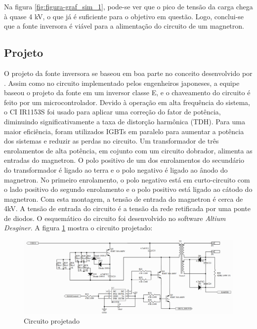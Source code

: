 Na figura \ref{fig:figura-graf_sim_1}, pode-se ver que o pico de tensão da carga chega à quase 4 kV, o que já é suficiente para o objetivo em questão. Logo, conclui-se que a fonte inversora é viável para a alimentação do circuito de um magnetron.

\subsection{Projeto}

O projeto da fonte inversora se baseou em boa parte no conceito desenvolvido por . Assim como no circuito implementado pelos engenheiros japoneses, a equipe baseou o projeto da fonte em um inversor classe E, e o chaveamento do circuito é feito por um microcontrolador. Devido à operação em alta frequência do sistema, o CI IR1153S foi usado para aplicar uma correção do fator de potência, diminuindo significativamente a taxa de distorção harmônica (TDH). Para uma maior eficiência, foram utilizados IGBTs em paralelo para aumentar a potência dos sistemas e reduzir as perdas no circuito. Um transformador de três enrolamentos de alta potência, em cojunto com um circuito dobrador, alimenta as entradas do magnetron. O polo positivo de um dos enrolamentos do secundário do transformador é ligado ao terra e o polo negativo é ligado ao ânodo do magnetron. No primeiro enrolamento, o polo negativo está em curto-circuito com o lado positivo do segundo enrolamento e o polo positivo está ligado ao cátodo do magnetron. Com esta montagem, a tensão de entrada do magnetron é cerca de 4kV. A tensão de entrada do circuito é a tensão da rede retificada por uma ponte de diodos. O esquemático do circuito foi desenvolvido no software \textit{Altium Desginer}. A figura \ref{fig:proj-font-inv} mostra o circuito projetado:

\begin{figure}[!htb]
    \centering
    \includegraphics[width=1.1\textwidth]{./dados/figuras/proj-font-inv}
    \caption{Circuito projetado}
    \label{fig:proj-font-inv}
\end{figure}

